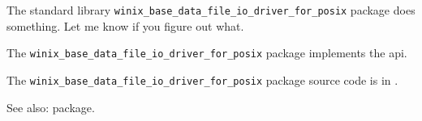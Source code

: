 
The standard library {\tt winix\_base\_data\_file\_io\_driver\_for\_posix} package does something. Let me know if you figure out what.

The {\tt winix\_base\_data\_file\_io\_driver\_for\_posix} package implements the  api.

The {\tt winix\_base\_data\_file\_io\_driver\_for\_posix} package source code is in .

See also:   package.

